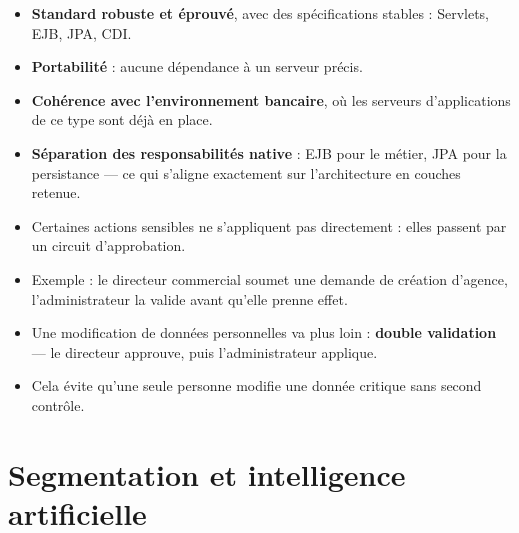\documentclass[a4paper,11pt]{article}
\begin{document}

\begin{itemize}[leftmargin=*,itemsep=1pt]
  \item \textbf{Standard robuste et éprouvé}, avec des spécifications stables : Servlets, EJB, JPA, CDI.
  \item \textbf{Portabilité} : aucune dépendance à un serveur précis.
  \item \textbf{Cohérence avec l'environnement bancaire}, où les serveurs d'applications de ce type sont déjà en place.
  \item \textbf{Séparation des responsabilités native} : EJB pour le métier, JPA pour la persistance --- ce qui s'aligne exactement sur l'architecture en couches retenue.
\end{itemize}


\begin{itemize}[leftmargin=*,itemsep=1pt]
  \item Certaines actions sensibles ne s'appliquent pas directement : elles passent par un circuit d'approbation.
  \item Exemple : le directeur commercial soumet une demande de création d'agence, l'administrateur la valide avant qu'elle prenne effet.
  \item Une modification de données personnelles va plus loin : \textbf{double validation} --- le directeur approuve, puis l'administrateur applique.
  \item Cela évite qu'une seule personne modifie une donnée critique sans second contrôle.
\end{itemize}

\section{Segmentation et intelligence artificielle}
\end{document}
